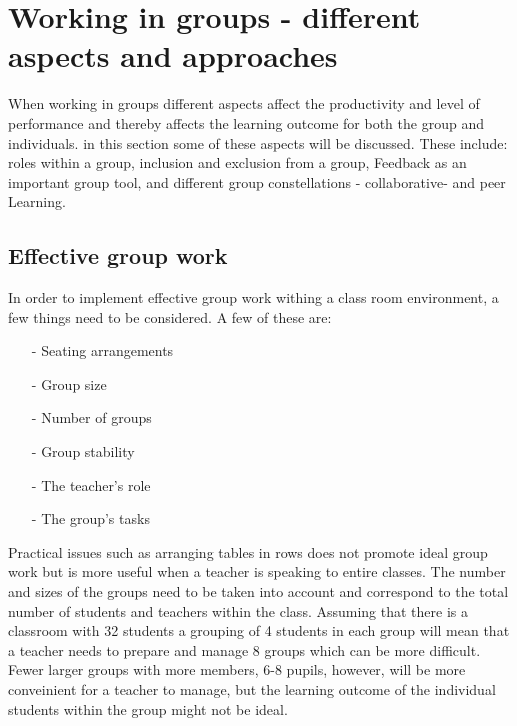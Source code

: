 \section{Working in groups - different aspects and approaches}




When working in groups different aspects affect the productivity and level of performance \cite{GodKlassekultur} and thereby affects the learning outcome for both the group and individuals. in this section some of these aspects will be discussed. These include: roles within a group, inclusion and exclusion from a group, Feedback as an important group tool, and different group constellations - collaborative- and peer Learning.

\subsection{Effective group work}
In order to implement effective group work withing a class room environment, a few things need to be considered\cite{collaborationSocialPedagogy}. A few of these are:
\begin{itemize}
	\item[-] Seating arrangements
	\item[-] Group size
	\item[-] Number of groups
	\item[-] Group stability
	\item[-] The teacher's role
	\item[-] The group's tasks
\end{itemize}

Practical issues such as arranging tables in rows does not promote ideal group work but is more useful when a teacher is speaking to entire classes. The number and sizes of the groups need to be taken into account and correspond to the total number of students and teachers within the class. Assuming that there is a classroom with 32 students a grouping of 4 students in each group will mean that a teacher needs to prepare and manage 8 groups which can be more difficult. Fewer larger groups with more members, 6-8 pupils, however, will be more conveinient for a teacher to manage, but the learning outcome of the individual students within the group might not be ideal\cite{collaborationSocialPedagogy}.\\

